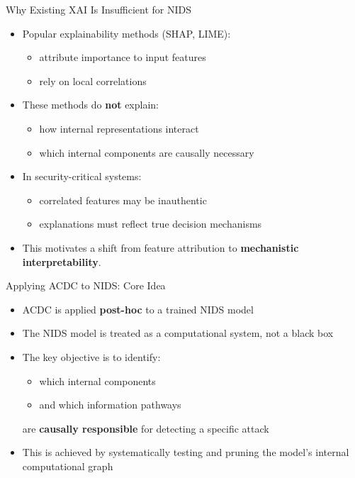 \documentclass{beamer}
\begin{document}
	\begin{frame}{Why Existing XAI Is Insufficient for NIDS}
		\begin{itemize}
			\item Popular explainability methods (SHAP, LIME):
			\begin{itemize}
				\item attribute importance to input features
				\item rely on local correlations
			\end{itemize}
			\item These methods do \textbf{not} explain:
			\begin{itemize}
				\item how internal representations interact
				\item which internal components are causally necessary
			\end{itemize}
			\item In security-critical systems:
			\begin{itemize}
				\item correlated features may be inauthentic
				\item explanations must reflect true decision mechanisms
			\end{itemize}
			\item This motivates a shift from feature attribution to
			\textbf{mechanistic interpretability}.
		\end{itemize}
	\end{frame}
	
	\begin{frame}{Applying ACDC to NIDS: Core Idea}
		\begin{itemize}
			\item ACDC is applied \textbf{post-hoc} to a trained NIDS model
			\item The NIDS model is treated as a computational system, not a black box
			\item The key objective is to identify:
			\begin{itemize}
				\item which internal components
				\item and which information pathways
			\end{itemize}
			are \textbf{causally responsible} for detecting a specific attack
			\item This is achieved by systematically testing and pruning the model’s
			internal computational graph
		\end{itemize}
	\end{frame}
	
\end{document}

